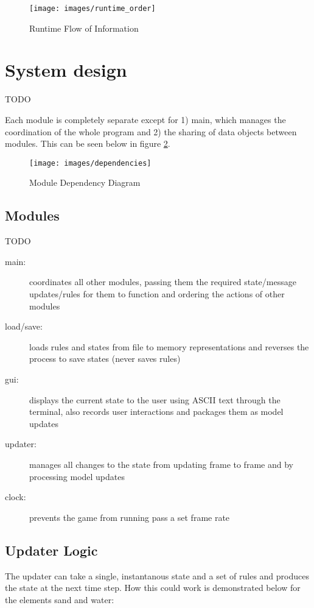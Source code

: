 \begin{figure}[H]
  \caption{Runtime Flow of Information}
  \label{fig:run}
  \vspace{3em}
  \texttt{[image: images/runtime\_order]}
\end{figure}

\section{System design}
TODO

Each module is completely separate except for 1) main, which manages the coordination
of the whole program and 2) the sharing of data objects between modules. This can be
seen below in figure \ref{fig:dep}.

\begin{figure}[H]
  \caption{Module Dependency Diagram}
  \label{fig:dep}
  \vspace{3em}
  \center\texttt{[image: images/dependencies]}
\end{figure}

\subsection{Modules}
TODO

\begin{description}
  \item[main:] coordinates all other modules, passing them the required state/message updates/rules for them to function and ordering the actions of other modules
  \item[load/save:] loads rules and states from file to memory representations and reverses the process to save states (never saves rules)
  \item[gui:] displays the current state to the user using ASCII text through the terminal, also records user interactions and packages them as model updates
  \item[updater:] manages all changes to the state from updating frame to frame and by processing model updates
  \item[clock:] prevents the game from running pass a set frame rate
\end{description}

\subsection{Updater Logic}
The updater can take a single, instantanous state and a set of rules and produces the state at
the next time step. How this could work is demonstrated below for the elements sand and water:

